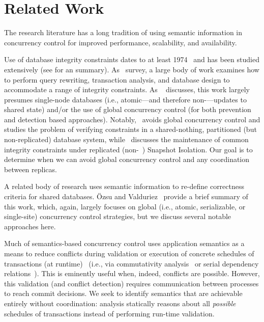 
\section{Related Work}
\label{sec:relatedwork}

The research literature has a long tradition of using semantic
information in concurrency control for improved performance,
scalability, and availability.


 Use of database integrity constraints
dates to at least 1974~\cite{florentin-constraints} and has been
studied extensively (see \cite{tamer-book} for an
summary). As~\cite{ic-survey,ic-survey-two} survey, a large body of
work examines how to perform query rewriting, transaction analysis,
and database design to accommodate a range of integrity
constraints. As ~\cite{tamer-book} discusses, this work largely
presumes single-node databases (i.e., atomic---and therefore
non-\cfree---updates to shared state) and/or the use of global
concurrency control (for both prevention and detection based
approaches). Notably,~\cite{local-verification} avoids global
concurrency control and studies the problem of verifying constraints
in a shared-nothing, partitioned (but non-replicated) database system,
while~\cite{kemme-si-ic} discusses the maintenance of common integrity
constraints under replicated (non-\cfree~\cite{hat-vldb}) Snapshot
Isolation. Our goal is to determine when we can avoid global
concurrency control and any coordination between replicas.


 A related body of
research uses semantic information to re-define correctness criteria
for shared databases. \"{O}zsu and Valduriez~\cite{tamer-book} provide
a brief summary of this work, which, again, largely focuses on global
(i.e., atomic, serializable, or single-site) concurrency control
strategies, but we discuss several notable approaches here.

Much of semantics-based concurrency control uses application semantics
as a means to reduce conflicts during validation or execution of
concrete schedules of transactions (at
runtime)~\cite{badrinath-semantics} (i.e., via commutativity
analysis~\cite{weihl-thesis} or serial dependency
relations~\cite{herlihy-apologizing}). This is eminently useful when,
indeed, conflicts are possible. However, this validation (and conflict
detection) requires communication between processes to reach commit
decisions. We seek to identify semantics that are achievable entirely
without coordination: \iconfluence analysis statically reasons about
all \textit{possible} schedules of transactions instead of performing
run-time validation.

